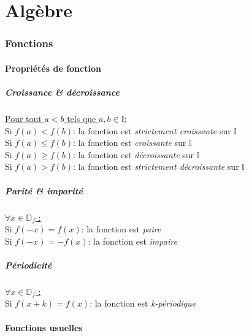 \documentclass{article}
\begin{document}
\pagebreak

\tableofcontents

\pagebreak

\pagebreak\part{Algèbre}
\setcounter{section}{0}
\renewcommand*{\theHsection}{chX.\the\value{section}}
\section{Fonctions}


\subsection{Propriétés de fonction}

\subsubsection{Croissance \& décroissance}
\underline{Pour tout $a<b$ tels que $a,b\in\mathbb{I}$:}\\
Si $f(a) < f(b)$: la fonction est \emph{strictement croissante} sur $\mathbb{I}$\\
Si $f(a) \le f(b)$: la fonction est \emph{croissante} sur $\mathbb{I}$\\
Si $f(a) \ge f(b)$: la fonction est \emph{décroissante} sur $\mathbb{I}$\\
Si $f(a) > f(b)$: la fonction est \emph{strictement décroissante} sur $\mathbb{I}$\\

\subsubsection{Parité \& imparité}
\underline{$\forall x \in \mathbb{D}_f$ :}\\
Si $f(-x) = f(x)$: la fonction est \emph{paire}\\
Si $f(-x) = -f(x)$: la fonction est \emph{impaire}

\subsubsection{Périodicité}
\underline{$\forall x \in \mathbb{D}_f$ :}\\
Si $f(x + k) = f(x)$: la fonction est \emph{k-périodique}
\subsection{Fonctions usuelles}
\end{document}
